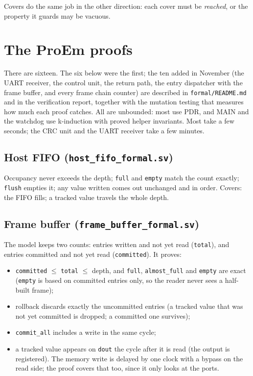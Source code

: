 \documentclass[11pt,a4paper]{article}
\newcommand{\file}[1]{\texttt{#1}}
\begin{document}
Covers do the same job in the other direction: each cover must be \emph{reached}, or the property it guards may be vacuous.

\section{The ProEm proofs}

There are sixteen. The six below were the first; the ten added in November (the UART receiver, the control unit, the return path, the entry dispatcher with the frame buffer, and every frame chain counter) are described in \file{formal/README.md} and in the verification report, together with the mutation testing that measures how much each proof catches. All are unbounded: most use PDR, and MAIN and the watchdog use k-induction with proved helper invariants. Most take a few seconds; the CRC unit and the UART receiver take a few minutes.

\subsection{Host FIFO (\file{host\_fifo\_formal.sv})}
Occupancy never exceeds the depth; \texttt{full} and \texttt{empty} match the count exactly; \texttt{flush} empties it; any value written comes out unchanged and in order. Covers: the FIFO fills; a tracked value travels the whole depth.

\subsection{Frame buffer (\file{frame\_buffer\_formal.sv})}
The model keeps two counts: entries written and not yet read (\texttt{total}), and entries committed and not yet read (\texttt{committed}). It proves:
\begin{itemize}
\item \texttt{committed} $\le$ \texttt{total} $\le$ depth, and \texttt{full}, \texttt{almost\_full} and \texttt{empty} are exact (\texttt{empty} is based on committed entries only, so the reader never sees a half-built frame);
\item rollback discards exactly the uncommitted entries (a tracked value that was not yet committed is dropped; a committed one survives);
\item \texttt{commit\_all} includes a write in the same cycle;
\item a tracked value appears on \texttt{dout} the cycle after it is read (the output is registered). The memory write is delayed by one clock with a bypass on the read side; the proof covers that too, since it only looks at the ports.
\end{itemize}
\end{document}
